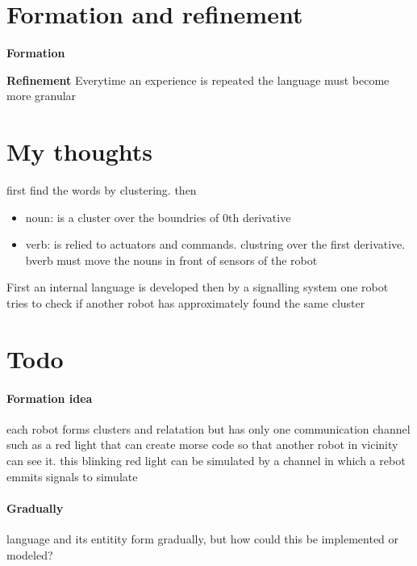     \section{Formation and refinement}
        \textbf{Formation}

        \textbf{Refinement} Everytime an experience is repeated the language must become more granular







\section{My thoughts}
    first find the words by clustering. then
    \begin{itemize}
        \item noun: is a cluster over the boundries of 0th derivative
        \item verb: is relied to actuators and commands. clustring over the first derivative. bverb must move the nouns in front of sensors of the robot
    \end{itemize}

    First an internal language is developed then by a signalling system one robot tries to check if another robot has approximately found the same cluster
\section{Todo}
    \paragraph{Formation idea}
        each robot  forms clusters and relatation but has only one communication channel such as a red light that can create morse code so that another robot in vicinity can see it. this blinking red light can be simulated by a channel in which a rebot emmits signals to simulate

    \paragraph{Gradually}
        language and its entitity form gradually, but how could this be implemented or modeled?


